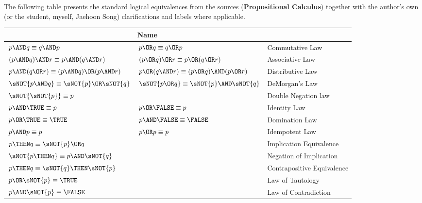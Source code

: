 The following table presents the standard logical equivalences from the sources (\textbf{Propositional Calculus}) together with 
the author's own (or the student, myself, Jaehoon Song) clarifications and labels where applicable.

\begin{table}[h!]
  \centering
  \renewcommand{\arraystretch}{1.2}
  \setlength{\tabcolsep}{8pt}
  \begin{tabular}{|p{5.0cm}|p{5.0cm}|p{5.2cm}|}
    \hline
    \rowcolor[HTML]{E0E0E0}
    \multicolumn{2}{|l|}{\textbf{Logical Equivalences}} & \textbf{Name} \\
    \hline
    $\,p \AND q \equiv q \AND p$ & $\,p \OR q \equiv q \OR p$ & Commutative Law \\
    \hline
    $\, (p \AND q) \AND r \equiv p \AND (q \AND r)$ & $\, (p \OR q) \OR r \equiv p \OR (q \OR r)$ & Associative Law \\
    \hline
    $\,p \AND (q \OR r) \equiv (p \AND q) \OR (p \AND r)$ & $\,p \OR (q \AND r) \equiv (p \OR q) \AND (p \OR r)$ & Distributive Law \\
    \hline
    $\,\sNOT{p \AND q} \equiv \sNOT{p} \OR \sNOT{q}$ & $\,\sNOT{p \OR q} \equiv \sNOT{p} \AND \sNOT{q}$ & DeMorgan's Law \\
    \hline
    \multicolumn{2}{|l|}{$\,\sNOT{\sNOT{p}} \equiv p$} & Double Negation law \\
    \hline
    $\,p \AND \TRUE \equiv p$ & $\,p \OR \FALSE \equiv p$ & Identity Law \\
    \hline
    $\,p \OR \TRUE \equiv \TRUE$ & $\,p \AND \FALSE \equiv \FALSE$ & Domination Law \\
    \hline
    $\,p \AND p \equiv p$ & $\,p \OR p \equiv p$ & Idempotent Law \\
    \hline
    \multicolumn{2}{|l|}{$\,p \THEN q \equiv \sNOT{p} \OR q$} & Implication Equivalence \\
    \hline
    \multicolumn{2}{|l|}{$\,\sNOT{p \THEN q} \equiv p \AND \sNOT{q}$} & Negation of Implication \\
    \hline
    \multicolumn{2}{|l|}{$\,p \THEN q \equiv \sNOT{q} \THEN \sNOT{p}$} & Contrapositive Equivalence \\
    \hline
    \multicolumn{2}{|l|}{$\,p \OR \sNOT{p} \equiv \TRUE$} & Law of Tautology \\
    \hline
    \multicolumn{2}{|l|}{$\,p \AND \sNOT{p} \equiv \FALSE$} & Law of Contradiction \\
    \hline
  \end{tabular}
\end{table}

